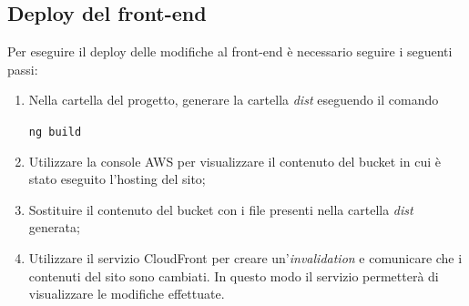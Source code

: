 		
	\subsection{Deploy del front-end}
	Per eseguire il \gls{deploy} delle modifiche al front-end è necessario seguire i seguenti passi:
	\begin{enumerate}
		\item Nella cartella del progetto, generare la cartella \emph{dist} eseguendo il comando
		\begin{center}
			\texttt{ng build}
		\end{center}
		\item Utilizzare la console \gls{AWS} per visualizzare il contenuto del bucket in cui è stato eseguito l'hosting del sito;
		\item Sostituire il contenuto del bucket con i file presenti nella cartella \emph{dist} generata;
		\item Utilizzare il servizio \gls{CloudFront} per creare un'\emph{invalidation} e comunicare che i
		contenuti del sito sono cambiati. In questo modo il servizio permetterà di visualizzare le modifiche effettuate.
	\end{enumerate}
